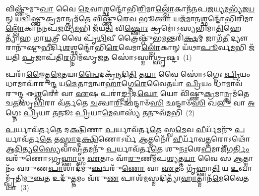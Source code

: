 {\anuvakamend[{\-\ul{𑌅}\-𑌗𑍍𑌨𑌿𑌷𑍍𑌟𑍍𑌵𑌾᳴ \ul{𑌵𑌾}\-𑌮\-\ul{𑌶𑍍𑌵𑍋} 𑌦𑍍𑌵𑌿𑌚᳴𑌤𑍍𑌵𑌾𑌰𑌿𑍞𑌶𑌚𑍍𑌚}]}%


{\anuvakamend[{𑌵𑌿𑌷𑍍𑌣𑍁᳴𑌮𑍁\-\ul{𑌖𑌾} 𑌅𑌨𑍍𑌨᳴𑌪\-\ul{𑌤𑍇} 𑌯𑌾𑌵᳴\-\ul{𑌤𑍀} 𑌵𑌿 𑌵𑍈 𑌪𑍁᳴𑌰𑍁𑌷\-\ul{𑌮𑌾}\-𑌤𑍍𑌰𑍇𑌣𑌾\-\ul{𑌗𑍍𑌨𑍇} 𑌤\-\ul{𑌵} 𑌶𑍍𑌰\-\ul{𑌵𑍋} 𑌬𑍍𑌰𑌹𑍍𑌮᳴ 𑌜\-\ul{𑌜𑍍𑌞𑌾}\-𑌨𑍟 𑌸𑍍𑌵᳴𑌯𑌮𑌾\-\ul{𑌤𑍃}\-𑌣𑍍𑌣𑌾\-\ul{𑌮𑍇}\-𑌷𑌾𑌂 𑌵𑍈 \ul{𑌪}\-𑌶𑍁𑌰𑍍𑌗𑌾᳴\-\ul{𑌯}\-𑌤𑍍𑌰𑍀 𑌕\-\ul{𑌸𑍍𑌤𑍍𑌵𑌾} 𑌦𑍍𑌵𑌾𑌦᳴𑌶}]}%

\setcounter{anuvakam}{0}
𑌵𑌿𑌷𑍍𑌣𑍁᳴𑌮𑍁\-\ul{𑌖𑌾} 𑌵𑍈 \ul{𑌦𑍇}\-𑌵𑌾𑌶𑍍𑌛𑌨𑍍𑌦𑍋᳴𑌭𑌿\-\ul{𑌰𑌿}\-𑌮𑌾\-\ul{𑌲𑍍𑌲𑍋𑌁}\-𑌕𑌾𑌨᳴𑌨𑌪\-\ul{𑌜}\-𑌯𑍍𑌯\-\ul{𑌮}\-𑌭𑍍𑌯᳴𑌜\-\ul{𑌯}\-\-\ul{𑌨𑍍} 𑌯𑌦𑍍𑌵𑌿᳴𑌷𑍍𑌣𑍁\-\ul{𑌕𑍍𑌰}\-𑌮𑌾𑌨𑍍𑌕𑍍𑌰𑌮᳴\-\ul{𑌤𑍇} 𑌵𑌿𑌷𑍍𑌣𑍁᳴\-\ul{𑌰𑍇}\-𑌵 \ul{𑌭𑍂}\-𑌤𑍍𑌵𑌾 𑌯𑌜᳴𑌮𑌾\-\ul{𑌨}\-𑌶𑍍𑌛𑌨𑍍𑌦𑍋᳴𑌭𑌿\-\ul{𑌰𑌿}\-𑌮𑌾\-\ul{𑌲𑍍𑌲𑍋𑌁}\-𑌕𑌾𑌨᳴𑌨𑌪\-\ul{𑌜}\-𑌯𑍍𑌯\-\ul{𑌮}\-𑌭𑌿 𑌜᳴𑌯\-\ul{𑌤𑌿} 𑌵𑌿\-\ul{𑌷𑍍𑌣𑍋𑌃} 𑌕𑍍𑌰𑌮𑍋॑\-𑌽𑌸𑍍𑌯𑌭𑌿𑌮𑌾\-\ul{𑌤𑌿}\-𑌹𑍇𑌤𑍍𑌯𑌾᳴𑌹 𑌗𑌾\-\ul{𑌯}\-𑌤𑍍𑌰𑍀 𑌵𑍈 𑌪𑍃᳴\-\ul{𑌥𑌿}\-𑌵𑍀 𑌤𑍍𑌰𑍈𑌷𑍍𑌠𑍁᳴𑌭\-\ul{𑌮}\-𑌨𑍍𑌤𑌰𑌿᳴\-\ul{𑌕𑍍𑌷}\-𑌮𑍍 𑌜𑌾𑌗᳴\-\ul{𑌤𑍀} 𑌦𑍍𑌯𑍗𑌰𑌾𑌨𑍁᳴𑌷𑍍𑌟𑍁\-\ul{𑌭𑍀}\-𑌰𑍍𑌦𑌿\-\ul{𑌶}\-𑌶𑍍𑌛𑌨𑍍𑌦𑍋᳴𑌭𑌿\-\ul{𑌰𑍇}\-𑌵𑍇𑌮𑌾\-\ul{𑌲𑍍𑌲𑍋𑌁}\-𑌕𑌾𑌨𑍍 𑌯᳴𑌥𑌾\-\ul{𑌪𑍂}\-𑌰𑍍𑌵\-\ul{𑌮}\-𑌭𑌿 𑌜᳴𑌯𑌤𑌿 \ul{𑌪𑍍𑌰}\-𑌜𑌾𑌪᳴𑌤𑌿\-\ul{𑌰}\-𑌗𑍍𑌨𑌿𑌮᳴𑌸𑍃𑌜\-\ul{𑌤} 𑌸𑍋॑\-𑌽𑌸𑍍𑌮𑌾\-\ul{𑌥𑍍𑌸𑍃}\-𑌷𑍍𑌟𑌃~(1)

𑌪𑌰𑌾᳴\-\ul{𑌙𑍈}\-𑌤𑍍𑌤\-\ul{𑌮𑍇}\-𑌤𑌯𑌾\-\ul{𑌨𑍍𑌵𑍈}\-𑌦𑌕𑍍𑌰᳴\-\ul{𑌨𑍍𑌦}\-𑌦𑌿\-\ul{𑌤𑌿} 𑌤\-\ul{𑌯𑌾} 𑌵𑍈 𑌸𑍋॑\-𑌽𑌗𑍍𑌨𑍇𑌃 \ul{𑌪𑍍𑌰𑌿}\-𑌯𑌂 𑌧𑌾𑌮𑌾𑌵𑌾᳴𑌰𑍁\-\ul{𑌨𑍍𑌦𑍍𑌧} 𑌯\-\ul{𑌦𑍇}\-𑌤𑌾\-\ul{𑌮}\-𑌨𑍍𑌵𑌾\-\ul{𑌹𑌾}\-𑌗𑍍𑌨𑍇\-\ul{𑌰𑍇}\-𑌵𑍈𑌤𑌯𑌾॑ \ul{𑌪𑍍𑌰𑌿}\-𑌯𑌂 𑌧𑌾𑌮𑌾𑌵᳴ 𑌰𑍁𑌨𑍍𑌦𑍍𑌧 𑌈\-\ul{𑌶𑍍𑌵}\-𑌰𑍋 𑌵𑌾 \ul{𑌏}\-𑌷 𑌪𑌰𑌾॑\-\ul{𑌙𑍍𑌪𑍍𑌰}\-𑌦\-\ul{𑌘𑍋} 𑌯𑍋 𑌵𑌿᳴𑌷𑍍𑌣𑍁\-\ul{𑌕𑍍𑌰}\-𑌮𑌾𑌨𑍍𑌕𑍍𑌰𑌮᳴𑌤𑍇 𑌚\-\ul{𑌤}\-𑌸𑍃\-\ul{𑌭𑌿}\-𑌰𑌾 𑌵᳴𑌰𑍍𑌤𑌤𑍇 \ul{𑌚}\-𑌤𑍍𑌵𑌾\-\ul{𑌰𑌿} 𑌛𑌨𑍍𑌦𑌾𑍞᳴\-\ul{𑌸𑌿} 𑌛𑌨𑍍𑌦𑌾𑍞᳴\-\ul{𑌸𑌿} 𑌖\-\ul{𑌲𑍁} 𑌵𑌾 \ul{𑌅}\-𑌗𑍍𑌨𑍇𑌃 \ul{𑌪𑍍𑌰𑌿}\-𑌯𑌾 \ul{𑌤}\-𑌨𑍂𑌃 \ul{𑌪𑍍𑌰𑌿}\-𑌯𑌾\-\ul{𑌮𑍇}\-𑌵𑌾𑌸𑍍𑌯᳴ \ul{𑌤}\-𑌨𑍁𑌵᳴\-\ul{𑌮}\-𑌭𑌿~(2)

\-\ul{𑌪}\-𑌰𑍍𑌯𑌾𑌵᳴𑌰𑍍𑌤𑌤𑍇 𑌦\-\ul{𑌕𑍍𑌷𑌿}\-𑌣𑌾 \ul{𑌪}\-𑌰𑍍𑌯𑌾𑌵᳴𑌰𑍍𑌤\-\ul{𑌤𑍇} 𑌸𑍍𑌵\-\ul{𑌮𑍇}\-𑌵 \ul{𑌵𑍀}\-𑌰𑍍𑌯᳴𑌮𑌨𑍁᳴ \ul{𑌪}\-𑌰𑍍𑌯𑌾𑌵᳴𑌰𑍍𑌤\-\ul{𑌤𑍇} 𑌤\-\ul{𑌸𑍍𑌮𑌾}\-𑌦𑍍𑌦\-\ul{𑌕𑍍𑌷𑌿}\-𑌣𑍋\-𑌽𑌰𑍍𑌧᳴ \ul{𑌆}\-𑌤𑍍𑌮𑌨𑍋᳴ \ul{𑌵𑍀}\-𑌰𑍍𑌯𑌾᳴𑌵\-\ul{𑌤𑍍𑌤}\-𑌰𑍋\-𑌽𑌥𑍋᳴ 𑌆\-\ul{𑌦𑌿}\-𑌤𑍍𑌯\-\ul{𑌸𑍍𑌯𑍈}\-𑌵𑌾𑌵𑍃\-\ul{𑌤}\-𑌮𑌨𑍁᳴ \ul{𑌪}\-𑌰𑍍𑌯𑌾𑌵᳴𑌰𑍍𑌤\-\ul{𑌤𑍇} 𑌶𑍁\-\ul{𑌨𑌃}\-𑌶𑍇\-\ul{𑌪}\-𑌮𑌾𑌜𑍀᳴𑌗\-\ul{𑌰𑍍𑌤𑌿𑌂} 𑌵𑌰𑍁᳴𑌣𑍋\-𑌽𑌗𑍃\-\ul{𑌹𑍍𑌣𑌾}\-𑌥𑍍𑌸 \ul{𑌏}\-𑌤𑌾𑌂 𑌵𑌾᳴\-\ul{𑌰𑍁}\-𑌣𑍀𑌮᳴𑌪\-\ul{𑌶𑍍𑌯}\-𑌤𑍍𑌤\-\ul{𑌯𑌾} 𑌵𑍈 𑌸 \ul{𑌆}\-𑌤𑍍𑌮𑌾𑌨𑌂᳴ 𑌵𑌰𑍁𑌣\-\ul{𑌪𑌾}\-𑌶𑌾𑌦᳴𑌮𑍁\-\ul{𑌞𑍍𑌚}\-𑌦𑍍𑌵𑌰𑍁᳴\-\ul{𑌣𑍋} 𑌵𑌾 \ul{𑌏}\-𑌤𑌂 𑌗𑍃᳴𑌹𑍍𑌣𑌾\-\ul{𑌤𑌿} 𑌯 \ul{𑌉}\-𑌖𑌾𑌮𑍍𑌪𑍍𑌰᳴𑌤𑌿\-\ul{𑌮𑍁}\-𑌞𑍍𑌚\-\ul{𑌤} 𑌉𑌦𑍁᳴\-\ul{𑌤𑍍𑌤}\-𑌮𑌂 𑌵᳴𑌰𑍁\-\ul{𑌣} 𑌪𑌾𑌶᳴\-\ul{𑌮}\-𑌸𑍍𑌮𑌦𑌿𑌤𑍍𑌯𑌾᳴\-\ul{𑌹𑌾}\-𑌤𑍍𑌮𑌾𑌨᳴\-\ul{𑌮𑍇}\-𑌵𑍈𑌤𑌯𑌾॑~(3)

